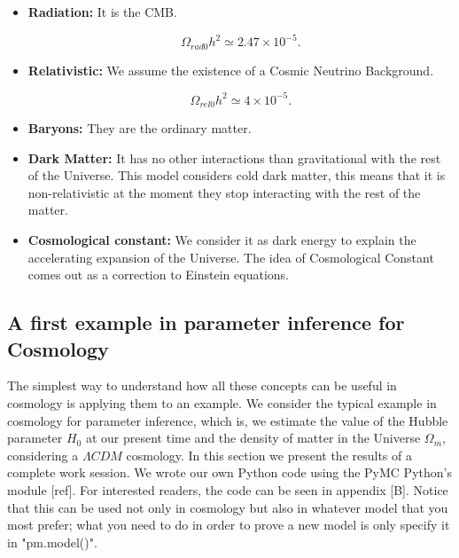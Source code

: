 \documentclass[onecolumn,           %
               showpacs,            %
               preprintnumbers,     %
               aps,                 %
               prl,          	    %
               letterpaper,             %
               superscriptaddress,      %
               nofootinbib,         %
               tightenlines,        %
               floats,floatfix      %
               ,usenatbib,
               ]{revtex4-1}
\begin{document}
\begin{itemize}
	\item \textbf{Radiation:} It is the CMB.
	
	\begin{equation}
	\Omega_{rad 0}h^2 \simeq 2.47 \times 10^{-5} .
	\end{equation}
	
	\item \textbf{Relativistic:} We assume the existence of a Cosmic Neutrino Background.
	
	\begin{equation}
	\Omega_{rel 0}h^2 \simeq 4 \times 10^{-5} .
	\end{equation}
	
	\item \textbf{Baryons:} They are the ordinary matter. 
	
	\item \textbf{Dark Matter:} It has no other interactions than gravitational with the rest of the Universe. This model considers cold dark matter, this means that it is non-relativistic at the moment they stop interacting with the rest of the matter.
	
	\item \textbf{Cosmological constant:} We consider it as dark energy to explain the accelerating expansion of the Universe. The idea of Cosmological Constant comes out as a correction to Einstein equations.
\end{itemize}



\subsection{A first example in parameter inference for Cosmology}

The simplest way to understand how all these concepts can be useful in cosmology is applying them to an example. We consider the typical example in cosmology for parameter inference, which is, we estimate the value of the Hubble parameter $H_0$ at our present time and the density of matter in the Universe $\Omega_m$, considering a $\Lambda CDM$ cosmology. In this section we present the results of a complete work session. We wrote our own Python code using the PyMC Python's module [ref]. For interested readers, the code can be seen in appendix [B]. Notice that this can be used not only in cosmology but also in whatever model that you most prefer; what you need to do in order to prove a new model is only specify it in "pm.model()". 
\end{document}
